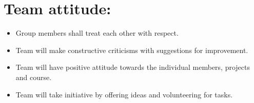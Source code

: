 \documentclass[12pt]{article}
\begin{document}
\section{Team attitude:}
\vspace{0.7cm}
\begin{itemize}
    \item Group members shall treat each other with respect.
    \item Team will make constructive criticisms with suggestions for improvement.
    \item Team will have positive attitude towards the individual members, projects
and course.
    \item Team will take initiative by offering ideas and volunteering for tasks.
\end{itemize}
\end{document}
